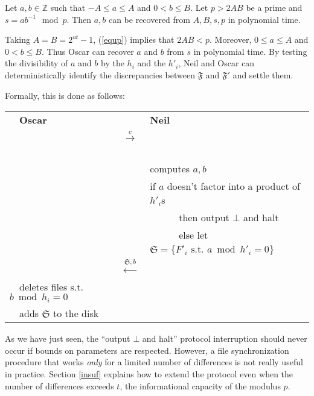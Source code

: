 \documentclass[11pt]{llncs}
\begin{document}
\begin{theorem}
\label{theo}
Let $a,b \in {\mathbb Z}$ such that $-A \leq a \leq A$ and $0<b \leq B$. Let $p>2AB$ be a prime and $s=a b^{-1} \mod p$.
Then $a,b$ can be recovered from $A,B,s,p$ in polynomial time.
\end{theorem}

Taking $A=B=2^{ut}-1$, (\ref{equp}) implies that $2AB<p$. Moreover, $0 \leq a \leq A$ and $0 <b \leq B$. Thus Oscar can
recover $a$ and $b$ from $s$ in polynomial time. By testing the divisibility of $a$ and $b$ by the $h_i$ and the $h'_i$, Neil and Oscar can
deterministically identify the discrepancies between $\mathfrak{F}$ and $\mathfrak{F}'$ and settle them.\smallskip

Formally, this is done as follows:\smallskip

\begin{center}
\begin{tabular}{|lcl|}\hline
~~{\bf Oscar}                       &                                                      &   {\bf Neil}~\\
                                   &~~{{\LARGE $\stackrel{c}{\longrightarrow}$}}~~        &   \\
                                   &                                                      &computes $a,b$~\\
                                   &                                                      &if $a$ doesn't factor into a product of $h'_i$s~\\
                                   &                                                      &~~~~~~then output $\bot$ and halt~\\
                                   &                                                      &~~~~~~else let $\mathfrak{S}=\{F'_i \mbox{~s.t.~} a \bmod h'_i =0\}$~~\\
                                   &~~{\LARGE $\stackrel{\mathfrak{S},b}{\longleftarrow}$}&\\
~~deletes files s.t. $b \bmod h_i =0$&                                                      &\\
~~adds $\mathfrak{S}$ to the disk    &                                                      &\\\hline
\end{tabular}
\end{center}

As we have just seen, the ``output $\bot$ and halt'' protocol interruption should never occur if bounds on parameters are respected. However, a file synchronization procedure that works {\sl only} for a limited number of differences is not really useful in practice. Section \ref{insuf} explains how to extend the protocol even when the number of differences exceeds $t$, the informational capacity of the modulus $p$.
\end{document}
